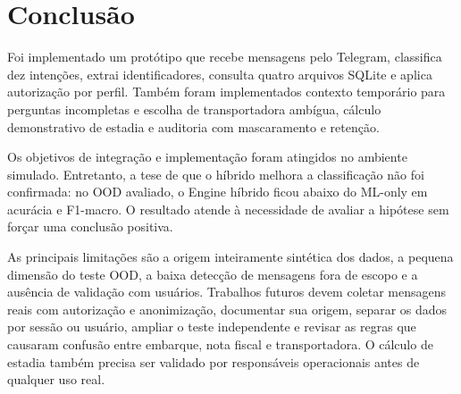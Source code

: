 \documentclass[conference]{IEEEtran}
\begin{document}
\section{Conclusão}

Foi implementado um protótipo que recebe mensagens pelo Telegram, classifica dez intenções, extrai identificadores, consulta quatro arquivos SQLite e aplica autorização por perfil. Também foram implementados contexto temporário para perguntas incompletas e escolha de transportadora ambígua, cálculo demonstrativo de estadia e auditoria com mascaramento e retenção.

Os objetivos de integração e implementação foram atingidos no ambiente simulado. Entretanto, a tese de que o híbrido melhora a classificação não foi confirmada: no OOD avaliado, o Engine híbrido ficou abaixo do ML-only em acurácia e F1-macro. O resultado atende à necessidade de avaliar a hipótese sem forçar uma conclusão positiva.

As principais limitações são a origem inteiramente sintética dos dados, a pequena dimensão do teste OOD, a baixa detecção de mensagens fora de escopo e a ausência de validação com usuários. Trabalhos futuros devem coletar mensagens reais com autorização e anonimização, documentar sua origem, separar os dados por sessão ou usuário, ampliar o teste independente e revisar as regras que causaram confusão entre embarque, nota fiscal e transportadora. O cálculo de estadia também precisa ser validado por responsáveis operacionais antes de qualquer uso real.
\end{document}
